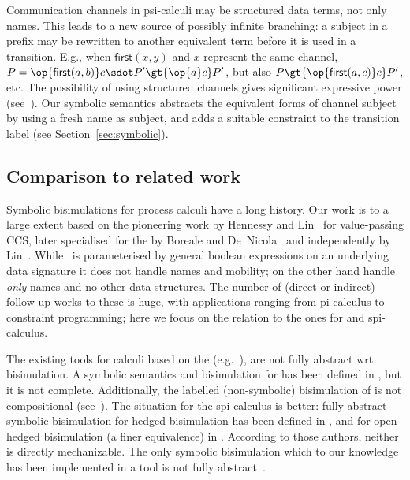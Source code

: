 \documentclass{eptcs}
\theoremstyle{definition}
\begin{document}
Communication channels in psi-calculi may be structured data terms,
not only names. This leads to a new source of possibly infinite
branching: a subject in a prefix may be rewritten to another
equivalent term before it is used in a transition. E.g., when $\mathsf{first}(x,y)$
and $x$ represent the same channel,
$P=\op{\mathsf{first}(a,b)}c\sdot P'\gt{\op{a}c}P'$, but also $P\gt{\op{\mathsf{first}(a,c)}c}P'$,
etc. The possibility of using
structured channels gives significant expressive power
(see~\cite{bengtson.johansson.ea:psi-calculi}). Our symbolic semantics
abstracts the equivalent forms of channel subject by using a fresh
name as subject, and adds a suitable constraint to the transition
label (see Section~\ref{sec:symbolic}).




\subsection{Comparison to related work}
Symbolic bisimulations for process calculi have a long history.
Our work is to a large extent based on the pioneering work by Hennessy
and Lin~\cite{hennessy.lin:symbolic-bisimulations} for value-passing
CCS, later specialised for the \pic{} by Boreale and
De~Nicola~\cite{boreale.de-nicola:symbolic-semantics} and independently
by Lin~\cite{lin:symbolic-transition,lin:computing-bisimulations}.
While~\cite{hennessy.lin:symbolic-bisimulations} is
parameterised by general boolean expressions on an underlying data
signature it does not handle names and mobility; on the other hand
\cite{boreale.de-nicola:symbolic-semantics,lin:symbolic-transition,lin:computing-bisimulations}
handle \emph{only} names and no other data structures.
The number of (direct or indirect) follow-up works to these is huge,
with applications ranging from pi-calculus to constraint programming;
here we focus on the relation to the ones for \api{} and spi-calculus.

The existing tools for calculi based on the \api{}
(e.g.~\cite{abadi.blanchet:analyzing-security,blanchet:efficient-cryptographic,blanchet.abadi.ea:automated-verification}),
are not fully abstract wrt bisimulation.  A symbolic
semantics and bisimulation for \api{} has been defined in
\cite{DBLP:conf/fsttcs/DelauneKR07}, but it is not complete.
Additionally, the labelled (non-symbolic) bisimulation of \api{} is
not compositional (see~\cite{bengtson.johansson.ea:psi-calculi}).
The situation for
the spi-calculus is better: fully abstract symbolic bisimulation for hedged
bisimulation has been defined in
\cite{borgstroem:equivalences-calculi}, and for open hedged
bisimulation (a finer equivalence) in \cite{briais:theory-tool}.  
According to those authors, neither is directly mechanizable.
The only symbolic
bisimulation which to our knowledge has been implemented in a tool is
not fully abstract~\cite{borgstroem.briais.ea:symbolic-bisimulation}.
\end{document}
